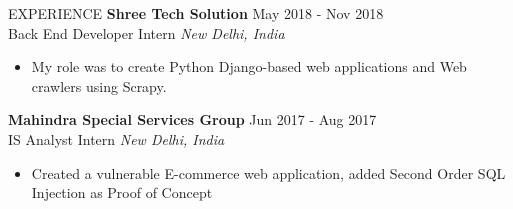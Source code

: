 \documentclass{resume} %
\begin{document}
\begin{rSection}{EXPERIENCE}
 \textbf{Shree Tech Solution} \hfill May 2018 - Nov 2018\\
Back End Developer Intern \hfill \textit{New Delhi, India}
 \begin{itemize}
    \itemsep -3pt {}
     \item My role was to create Python Django-based web applications and Web crawlers using Scrapy.
 \end{itemize}

 \textbf{Mahindra Special Services Group} \hfill Jun 2017 - Aug 2017\\
IS Analyst Intern \hfill \textit{New Delhi, India}
 \begin{itemize}
    \itemsep -3pt {}
     \item Created a vulnerable E-commerce web application, added Second Order SQL Injection as Proof of Concept
 \end{itemize}

\end{rSection}
\end{document}
